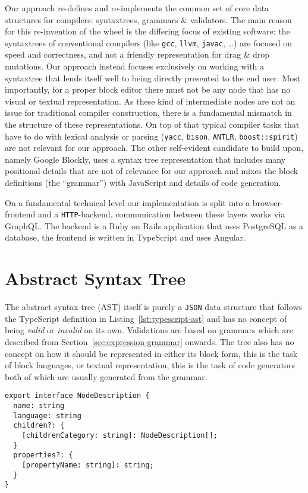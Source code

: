 \documentclass[sigconf,natbib=false]{acmart}
\newcommand{\enquote}[1]{``#1''}
\begin{document}
Our approach re-defines and re-implements the common set of core data structures for compilers: syntax\-trees, grammars \& validators. The main reason for this re-invention of the wheel is the differing focus of existing software: the syntaxtrees of conventional compilers (like \texttt{gcc}, \texttt{llvm}, \texttt{javac}, …) are focused on speed and correctness, and not a friendly representation for drag \& drop mutations. Our approach instead focuses exclusively on working with a syntaxtree that lends itself well to being directly presented to the end user. Most importantly, for a proper block editor there must not be any node that has no visual or textual representation. As these kind of intermediate nodes are not an issue for traditional compiler construction, there is a fundamental mismatch in the structure of these representations. On top of that typical compiler tasks that have to do with lexical analysis or parsing (\texttt{yacc}, \texttt{bison}, \texttt{ANTLR}, \texttt{boost::spirit}) are not relevant for our approach. The other self-evident candidate to build upon, namely Google Blockly, uses a syntax tree representation that includes many positional details that are not of relevance for our approach and mixes the block definitions (the \enquote{grammar}) with JavaScript and details of code generation.

On a fundamental technical level our implementation is split into a browser-frontend and a \texttt{HTTP}-backend, communication between these layers works via GraphQL. The backend is a Ruby on Rails application that uses PostgreSQL as a database, the frontend is written in TypeScript and uses Angular.

\section{Abstract Syntax Tree}
\label{sec:abstract-syntax-tree}

The abstract syntax tree (AST) itself is purely a \texttt{JSON} data structure that follows the TypeScript definition in Listing~\ref{lst:typescript-ast} and has no concept of being \textit{valid} or \textit{invalid} on its own. Validations are based on grammars which are described from Section~\ref{sec:expression-grammar} onwards. The tree also has no concept on how it should be represented in either its block form, this is the task of block languages, or textual representation, this is the task of code generators both of which are usually generated from the grammar.

\begin{lstlisting}[caption={TypeScript definition of AST}, label=lst:typescript-ast]
export interface NodeDescription {
  name: string
  language: string
  children?: {
    [childrenCategory: string]: NodeDescription[];
  }
  properties?: {
    [propertyName: string]: string;
  }
}
\end{lstlisting}
\end{document}
